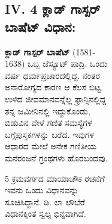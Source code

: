 \begin{figure}[H]
\begin{figure}[H]
\begin{figure}[h]
\begin{figure}[h]

\subsection*{IV. 4 ಕ್ಲಾಡ್ ಗಾಸ್ಪರ್ ಬಾಷೆಟ್ ವಿಧಾನ:}

\textbf{ಕ್ಲಾಡ್ ಗಾಸ್ಪರ್ ಬಾಷೆಟ್} (1581-1638) ಒಬ್ಬ ಜೆಸ್ಯೂಟ್ ಪಾದ್ರಿ. ಒಂದು ವರ್ಷ ಧರ್ಮ\-ಪ್ರಚಾರದಲ್ಲಿದ್ದ. ನಂತರ ಅನಾರೋಗ್ಯದ ಕಾರಣ ಆ ಕೆಲಸ ಬಿಟ್ಟ. ಉಳಿದ ಜೀವಮಾನ\-ವನ್ನೆಲ್ಲ ಫ್ರಾನ್ಸಿನಲ್ಲಿದ್ದ ತನ್ನ ಜಮೀನಿನಲ್ಲಿ ಇದ್ದುಕೊಂಡು, ಬಿಡುವಿನ ವೇಳೆ ಗಣಿತ ಸಮಸ್ಯೆಗಳ ಬಗ್ಗೆ\break ಪುಸ್ತಕಗಳನ್ನು ಬರೆದ. ಇವುಗಳ ಆಧಾರದ ಮೇಲೆ ಅನೇಕ ಗಣಿತೀಯ ಮನರಂಜನೆ ಗ್ರಂಥಗಳು ಹೊರಬಂದವು.

5 ಕ್ರಮವರ್ಗದ ಮಾಯಾಚೌಕ ರಚನೆಗೆ ಇವನು ಒಂದು ವಿಧಾನವನ್ನು ಸೂಚಿಸಿದ್ದಾನೆ. ಡಿ. ಲಾ ಲೌಬೆರೆ ವಿಧಾನಕ್ಕಿಂತ ಸ್ವಲ್ಪ ಭಿನ್ನವಾಗಿದೆ.


\end{figure}
\end{figure}
\end{figure}
\end{figure}
